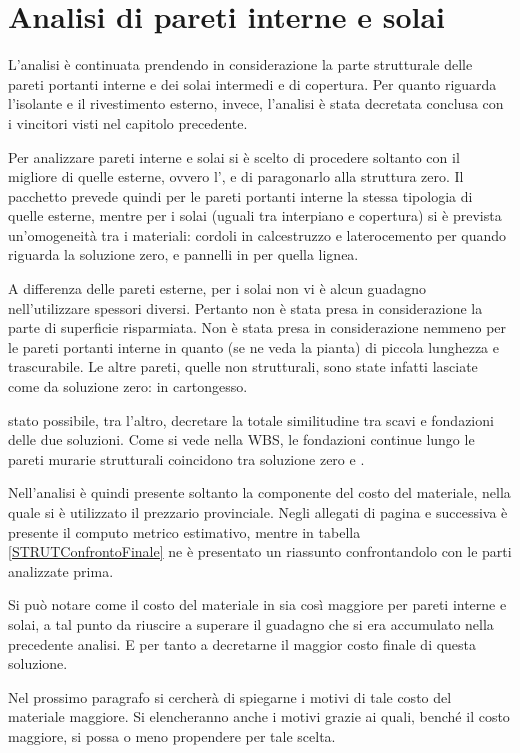 \chapter{Analisi di pareti interne e solai}
L'analisi è continuata prendendo in considerazione la parte strutturale delle pareti portanti interne e dei solai intermedi e di copertura.
Per quanto riguarda l'isolante e il rivestimento esterno, invece, l'analisi è stata decretata conclusa con i vincitori visti nel capitolo precedente.

Per analizzare pareti interne e solai si è scelto di procedere soltanto con il migliore di quelle esterne, ovvero l'\xlam, e di paragonarlo alla struttura zero.
Il pacchetto prevede quindi per le pareti portanti interne la stessa tipologia di quelle esterne, mentre per i solai (uguali tra interpiano e copertura) si è prevista un'omogeneità tra i materiali: cordoli in calcestruzzo e laterocemento per quando riguarda la soluzione zero, e pannelli in \xlam{} per quella lignea.

A differenza delle pareti esterne, per i solai non vi è alcun guadagno nell'utilizzare spessori diversi. 
Pertanto non è stata presa in considerazione la parte di superficie risparmiata. 
Non è stata presa in considerazione nemmeno per le pareti portanti interne in quanto (se ne veda la pianta) di piccola lunghezza e trascurabile.
Le altre pareti, quelle non strutturali, sono state infatti lasciate come da soluzione zero: in cartongesso.

\e stato possibile, tra l'altro, decretare la totale similitudine tra scavi e fondazioni delle due soluzioni.
Come si vede nella WBS, le fondazioni continue lungo le pareti murarie strutturali coincidono tra soluzione zero e \xlam.

Nell'analisi è quindi presente soltanto la componente del costo del materiale, nella quale si è utilizzato il prezzario provinciale.
Negli allegati di pagina \pageref{STRUTMuraturaTotaleIntESol} e successiva è presente il computo metrico estimativo, mentre in tabella \ref{STRUTConfrontoFinale} ne è presentato un riassunto confrontandolo con le parti analizzate prima.


Si può notare come il costo del materiale in \xlam{} sia così maggiore per pareti interne e solai, a tal punto da riuscire a superare il guadagno che si era accumulato nella precedente analisi.
E per tanto a decretarne il maggior costo finale di questa soluzione.

Nel prossimo paragrafo si cercherà di spiegarne i motivi di tale costo del materiale maggiore.
Si elencheranno anche i motivi grazie ai quali, benché il costo maggiore, si possa o meno propendere per tale scelta.








